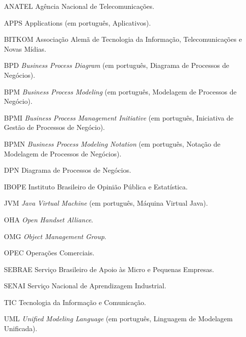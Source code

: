
\begin{siglas}
  \item[ANATEL] Agência Nacional de Telecomunicações.
  \item[APPS] Applications (em português, Aplicativos).
  \item[BITKOM] Associação Alemã de Tecnologia da Informação, Telecomunicações e Novas Mídias.
  \item[BPD] \textit{Business Process Diagram} (em português, Diagrama de Processos de Negócios).
  \item[BPM] \textit{Business Process Modeling} (em português, Modelagem de Processos de Negócio).
  \item[BPMI] \textit{Business Process Management Initiative} (em português, Iniciativa de Gestão de Processos de Negócio).
  \item[BPMN] \textit{Business Process Modeling Notation} (em português, Notação de Modelagem de Processos de Negócios).
  \item[DPN] Diagrama de Processos de Negócios.
  \item[IBOPE] Instituto Brasileiro de Opinião Pública e Estatística.
  \item[JVM] \textit{Java Virtual Machine} (em português, Máquina Virtual Java).
  \item[OHA] \textit{Open Handset Alliance}.
  \item[OMG] \textit{Object Management Group}.
  \item[OPEC] Operações Comerciais.
  \item[SEBRAE] Serviço Brasileiro de Apoio às Micro e Pequenas Empresas.
  \item[SENAI] Serviço Nacional de Aprendizagem Industrial.
  \item[TIC] Tecnologia da Informação e Comunicação.
  \item[UML] \textit{Unified Modeling Language} (em português, Linguagem de Modelagem Unificada).
   
\end{siglas}

